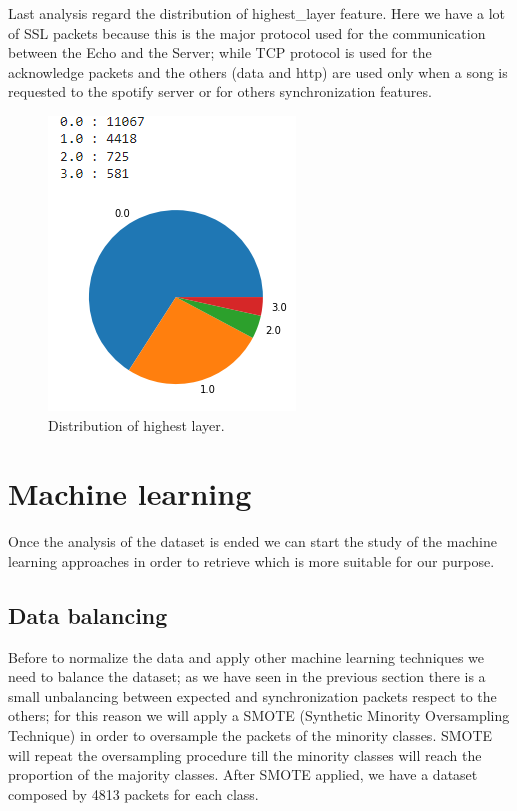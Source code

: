 \documentclass[sigconf]{acmart}
\begin{document}
    Last analysis regard the distribution of highest\_layer feature. Here we have a lot of SSL packets because this is the major protocol used for the communication between the Echo and the Server; while TCP protocol is used for the acknowledge packets and the others (data and http) are used only when a song is requested to the spotify server or for others synchronization features.
    \begin{figure}[h!]
        \includegraphics[width=0.6\linewidth]{img/highest_layer.png}
        \caption{Distribution of highest layer.}
        \label{fig:highest_layer}
    \end{figure}


    \section{Machine learning}
    Once the analysis of the dataset is ended we can start the study of the machine learning approaches in order to retrieve which is more suitable for our purpose.

    \subsection{Data balancing}
    Before to normalize the data and apply other machine learning techniques we need to balance the dataset; as we have seen in the previous section there is a small unbalancing between expected and synchronization packets respect to the others; for this reason we will apply a SMOTE (Synthetic Minority Oversampling Technique) in order to oversample the packets of the minority classes. SMOTE will repeat the oversampling procedure till the minority classes will reach the proportion of the majority classes. After SMOTE applied, we have a dataset composed by 4813 packets for each class.
\end{document}
